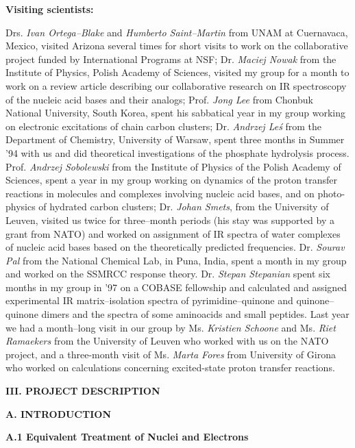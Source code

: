\vspace{2mm}
\noindent
{\bf Visiting scientists:}

\noindent
Drs. {\em Ivan Ortega--Blake}  and {\em Humberto Saint--Martin} from 
UNAM at Cuernavaca, Mexico, visited 
Arizona several times for short visits
to work on the collaborative
project funded by International Programs at NSF; 
Dr. {\em Maciej Nowak} from the Institute of
Physics, Polish Academy of Sciences, visited 
my group for a month to work on a review article describing
our collaborative research on IR spectroscopy of 
the nucleic acid bases and their analogs; 
Prof. {\em Jong Lee} from Chonbuk National University,
South Korea, spent his sabbatical year in my group 
working on electronic excitations of chain carbon clusters;
Dr. {\em Andrzej Le\'{s}} from the Department of Chemistry, 
University of Warsaw, spent three months in Summer '94 with us and did
theoretical investigations of the phosphate hydrolysis 
process. 
Prof. {\em Andrzej Sobolewski} from the Institute of
Physics of the Polish Academy of Sciences, 
spent a year in my group working on dynamics of the proton
transfer reactions in molecules and complexes involving nucleic 
acid bases, and on photo-physics of hydrated carbon
clusters; 
Dr. {\em Johan Smets}, from the University 
of Leuven, visited us twice for three--month periods (his stay
was supported by a grant from NATO) and worked 
on assignment of IR spectra of water complexes of nucleic
acid bases based on the theoretically predicted 
frequencies.  
Dr. {\em Sourav Pal} from the National Chemical Lab,
in Puna, India, spent a month in my group and 
worked on the SSMRCC response theory.
Dr. {\em Stepan Stepanian} spent six months in my group 
in '97 on a COBASE fellowship and calculated and
assigned experimental IR matrix--isolation 
spectra of pyrimidine--quinone and quinone--quinone dimers
and the spectra of some aminoacids and small peptides.
Last year we had a month--long visit in our group by Ms.
{\em Kristien Schoone} and Ms. {\em Riet Ramaekers} 
from the University of Leuven
who worked with us on the NATO project, and a three-month visit
of Ms. {\em Marta Fores} from University of Girona who worked
on calculations concerning excited-state proton transfer
reactions.

\vspace{4mm}
\noindent
{\bf III.  PROJECT DESCRIPTION}

\vspace{2mm}
\noindent
{\bf A. INTRODUCTION}

\vspace{2mm}
\noindent
{\bf A.1 Equivalent Treatment of Nuclei and Electrons}

